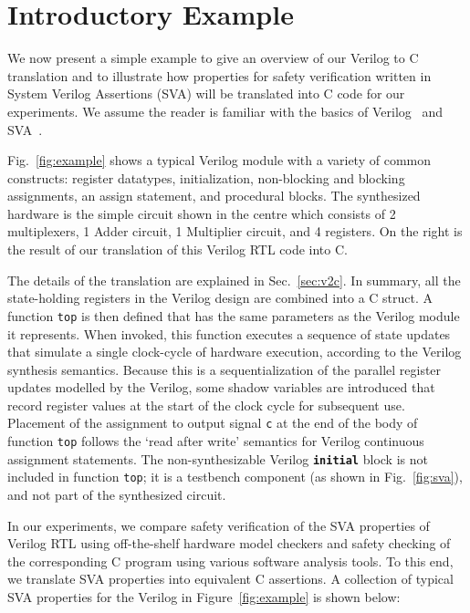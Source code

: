 \section{Introductory Example} 

We now present a simple example to give an overview of our Verilog to C translation and to illustrate how properties for safety verification written in System Verilog Assertions (SVA) will be translated into C code for our experiments. We assume the reader is familiar with the basics of Verilog~\cite{verilog} and SVA~\cite{sva_ref}. 

Fig.\ \ref{fig:example} shows a typical Verilog module with a variety of common constructs: register datatypes, initialization, non-blocking and blocking assignments, an assign statement, and procedural blocks.  The synthesized hardware is the simple circuit shown in the centre which consists of 2 multiplexers, 1 Adder circuit, 1 Multiplier circuit, and 4 registers.  On the right is the result of our translation of this Verilog RTL code into C.

The details of the translation are explained in Sec.\ \ref{sec:v2c}. In summary, all the state-holding registers in the Verilog design are combined into a C struct. A function \texttt{top} is then defined that has the same parameters as the Verilog module it represents. When invoked, this function executes a sequence of state updates that simulate a single clock-cycle of hardware execution, according to the Verilog synthesis semantics. Because this is a sequentialization of the parallel register updates modelled by the Verilog, some shadow variables are introduced that record register values at the start of the clock cycle for subsequent use.  Placement of the assignment to output signal \texttt{c} at the end of the body of function \texttt{top} follows the `read after write' semantics for Verilog continuous assignment statements.  
The non-synthesizable Verilog {\bf\texttt{initial}} block is not included in function \texttt{top}; it is a testbench component (as shown in Fig.\ \ref{fig:sva}), and not part of the synthesized circuit.   

In our experiments, we compare safety verification of the SVA properties of Verilog RTL using 
off-the-shelf hardware model checkers and safety checking of the corresponding C program using 
various software analysis tools.  To this end, we translate SVA properties into equivalent C 
assertions. A collection of typical SVA properties for the Verilog in Figure~\ref{fig:example} 
is shown below:

